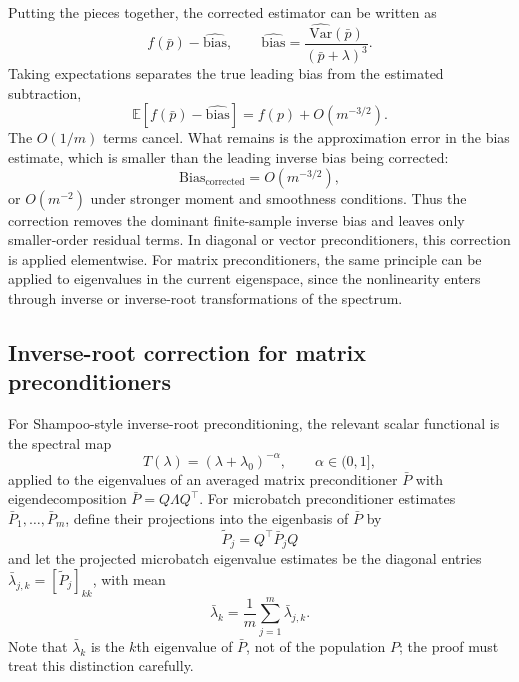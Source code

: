\documentclass{article}
\newcommand{\E}{\mathbb{E}}
\newcommand{\Var}{\mathrm{Var}}
\begin{document}
Putting the pieces together, the corrected estimator can be written as
\begin{equation}
    f(\bar p)
    -
    \widehat{\mathrm{bias}},
    \qquad
    \widehat{\mathrm{bias}}
    =
    \frac{\widehat{\Var}(\bar p)}{(\bar p+\lambda)^3}.
\end{equation}
Taking expectations separates the true leading bias from the estimated subtraction,
\begin{equation}
    \E[f(\bar p)-\widehat{\mathrm{bias}}]
    =
    f(p)
    +
    O(m^{-3/2}).
\end{equation}
The $O(1/m)$ terms cancel. What remains is the approximation error in the bias estimate, which is smaller than the leading inverse bias being corrected:
\begin{equation}
    \mathrm{Bias}_{\mathrm{corrected}}
    =
    O(m^{-3/2}),
\end{equation}
or $O(m^{-2})$ under stronger moment and smoothness conditions. Thus the correction removes the dominant finite-sample inverse bias and leaves only smaller-order residual terms. In diagonal or vector preconditioners, this correction is applied elementwise. For matrix preconditioners, the same principle can be applied to eigenvalues in the current eigenspace, since the nonlinearity enters through inverse or inverse-root transformations of the spectrum.
\subsection{Inverse-root correction for matrix preconditioners}
\label{app:inverse-root-proof}

For Shampoo-style inverse-root preconditioning, the relevant scalar functional is the spectral map
\begin{equation}
    T(\lambda) = (\lambda+\lambda_0)^{-\alpha},
    \qquad
    \alpha\in(0,1],
\end{equation}
applied to the eigenvalues of an averaged matrix preconditioner $\bar P$ with eigendecomposition $\bar P=Q\Lambda Q^\top$. For microbatch preconditioner estimates $\bar P_1,\ldots,\bar P_m$, define their projections into the eigenbasis of $\bar P$ by
\begin{equation}
    \widetilde P_j = Q^\top \bar P_j Q
\end{equation}
and let the projected microbatch eigenvalue estimates be the diagonal entries $\bar\lambda_{j,k}=[\widetilde P_j]_{kk}$, with mean
\begin{equation}
    \bar\lambda_k
    =
    \frac{1}{m}\sum_{j=1}^m \bar\lambda_{j,k}.
\end{equation}
Note that $\bar\lambda_k$ is the $k$th eigenvalue of $\bar P$, not of the population $P$; the proof must treat this distinction carefully.
\end{document}
